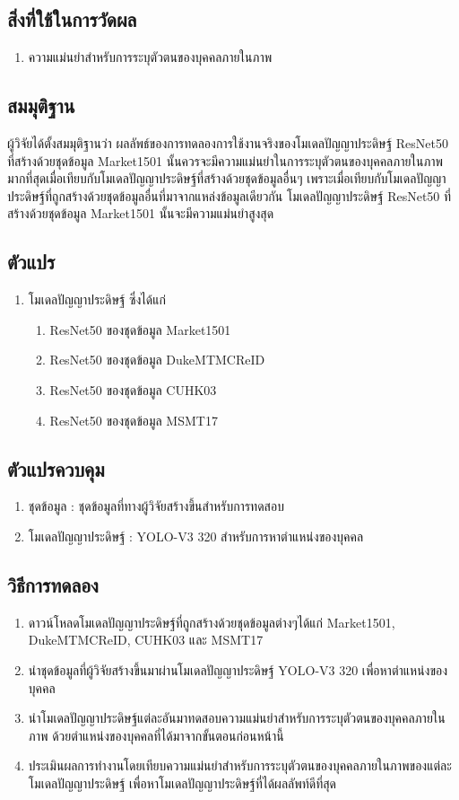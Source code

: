 \subsection*{สิ่งที่ใช้ในการวัดผล}
	\begin{enumerate}
		\item ความแม่นยำสำหรับการระบุตัวตนของบุคคลภายในภาพ
	\end{enumerate}
\subsection*{สมมุติฐาน}
ผู้วิจัยได้ตั้งสมมุติฐานว่า ผลลัพธ์ของการทดลองการใช้งานจริงของโมเดลปัญญาประดิษฐ์ ResNet50 ที่สร้างด้วยชุดข้อมูล Market1501 
นั้นควรจะมีความแม่นยำในการระบุตัวตนของบุคคลภายในภาพมากที่สุดเมื่อเทียบกับโมเดลปัญญาประดิษฐ์ที่สร้างด้วยชุดข้อมูลอื่นๆ
เพราะเมื่อเทียบกับโมเดลปัญญาประดิษฐ์ที่ถูกสร้างด้วยชุดข้อมูลอื่นที่มาจากแหล่งข้อมูลเดียวกัน โมเดลปัญญาประดิษฐ์ ResNet50 ที่สร้างด้วยชุดข้อมูล Market1501 นั้นจะมีความแม่นยำสูงสุด
\subsection*{ตัวแปร}
	\begin{enumerate}
		\item โมเดลปัญญาประดิษฐ์ ซึ่งได้แก่
		\begin{enumerate}
			\item ResNet50 ของชุดข้อมูล Market1501
			\item ResNet50 ของชุดข้อมูล DukeMTMCReID
			\item ResNet50 ของชุดข้อมูล CUHK03	
			\item ResNet50 ของชุดข้อมูล MSMT17
		\end{enumerate}
	\end{enumerate}
\subsection*{ตัวแปรควบคุม}
	\begin{enumerate}
		\item ชุดข้อมูล : ชุดข้อมูลที่ทางผู้วิจัยสร้างขึ้นสำหรับการทดสอบ
		\item โมเดลปัญญาประดิษฐ์ : YOLO-V3 320  สำหรับการหาตำแหน่งของบุคคล
	\end{enumerate}
\subsection*{วิธีการทดลอง}
	\begin{enumerate}
		\item ดาวน์โหลดโมเดลปัญญาประดิษฐ์ที่ถูกสร้างด้วยชุดข้อมูลต่างๆได้แก่ Market1501, DukeMTMCReID, CUHK03 และ MSMT17
		\item นำชุดข้อมูลที่ผู้วิจัยสร้างขึ้นมาผ่านโมเดลปัญญาประดิษฐ์ YOLO-V3 320 เพื่อหาตำแหน่งของบุคคล
		\item นำโมเดลปัญญาประดิษฐ์แต่ละอันมาทดสอบความแม่นยำสำหรับการระบุตัวตนของบุคคลภายในภาพ ด้วยตำแหน่งของบุคคลที่ได้มาจากขั้นตอนก่อนหน้านี้
		\item ประเมินผลการทำงานโดยเทียบความแม่นยำสำหรับการระบุตัวตนของบุคคลภายในภาพของแต่ละโมเดลปัญญาประดิษฐ์ เพื่อหาโมเดลปัญญาประดิษฐ์ที่ได้ผลลัพท์ดีที่สุด
\end{enumerate}
